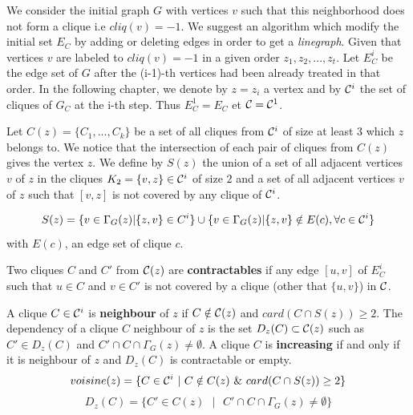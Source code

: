 We consider the initial graph $G$ with vertices $v$ such that this neighborhood does not form a clique i.e $cliq(v) = -1$. 
We suggest an algorithm which modify the initial set $E_C$ by adding or deleting edges in order to get a {\em linegraph}. 
Given that vertices $v$ are labeled to $cliq(v) = -1$ in a given order $z_1 , z_2 , ..., z_t$. 
Let $E_C^i$ be the edge set of $G$ after the (i-1)-th vertices had been already treated in that order.  
In the following chapter, we denote by  $z = z_i$  a vertex and by ${\cal C}^{i}$ the set of cliques of $G_C$ at the i-th step. Thus $E_C^1 = E_C$ et ${\cal C} = {\cal C}^{1}$.

Let  $C(z) = \{C_1 , . . . , C_k \}$ be a set of all cliques from ${\cal C}^{i}$ of size at least 3 which  $z$ belongs to. 
We notice that the intersection of each pair of cliques from $C(z)$ gives the vertex $z$. 
We define by $S(z)$ the union of a set of all adjacent vertices $v$ of $z$ in the cliques $K_2 = \{v, z\} \in {\cal C}^i$ of size $2$ and a set of all adjacent vertices $v$ of $z$ such that $[v, z]$ is not covered by any clique of ${\cal C}^i$. 

\begin{equation}	
S(z) = \{ v \in \Gamma_{G}(z) | \{z,v\} \in C^i \} \cup \{ v \in \Gamma_{G}(z) | \{z,v\} \notin E(c), \forall c \in {\cal C}^i\}
\end{equation} 
with $E(c)$, an edge set of clique $c$.

\begin{definition}
Two cliques $C$ and $C'$ from ${\cal C}(z)$ are  {\bf contractables} if any edge $[u,v]$  of $E_C^i$ such that $u \in C$ and $v \in C'$ is not covered  by a clique (other that $\{u,v\}$) in ${\cal C}$. 
\end{definition}


\begin{definition}
A clique $C \in {\cal C}^i$ is {\bf neighbour} of $z$ if $C \notin {\cal C}(z)$ and $card(C \cap S(z)) \ge 2$.
The dependency of a clique $C$ neighbour of $z$ is the set $D_{z}(C) \subset {\cal C}(z)$ such as $C' \in D_{z}(C) $ and $C' \cap C \cap \Gamma_{G}(z) \ne \emptyset$.
A clique $C$ is {\bf increasing} if and only if it is neighbour of $z$ and $D_{z}(C)$ is contractable or empty.
\begin{equation}
voisine(z) = \{C \in {\cal C}^i \mbox{ } | \mbox{ } C \notin C(z) \mbox{ } \& \mbox{ } card(C \cap S(z)) \ge 2 \} \newline
\end{equation}
\begin{equation}
D_{z}(C) = \{ C' \in C(z) \mbox{ }|  \mbox{ } C' \cap C \cap \Gamma_{G}(z) \ne \emptyset \}
\end{equation}

\end{definition}

